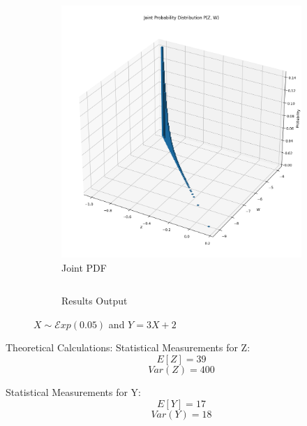 \documentclass{article}
\begin{document}
\begin{figure}[H]
\begin{subfigure}{0.45\textwidth}
    \includegraphics[width=\linewidth]{results/section3/d(2).png}
    \caption{Joint PDF}
  \end{subfigure}
  \begin{subfigure}{\textwidth}
    \centering
    \inputminted{text}{results/section3/d.txt}
    \caption{Results Output}
  \end{subfigure}
  \caption{$X \sim \mathcal{E}xp(0.05)$ and $Y = 3X+2$}
\end{figure}
Theoretical Calculations:
Statistical Measurements for Z:
$$E[Z] = 39$$
$$Var(Z) = 400$$

Statistical Measurements for Y:
$$E[Y] = 17$$
$$Var(Y) = 18$$
\newpage
\end{document}
